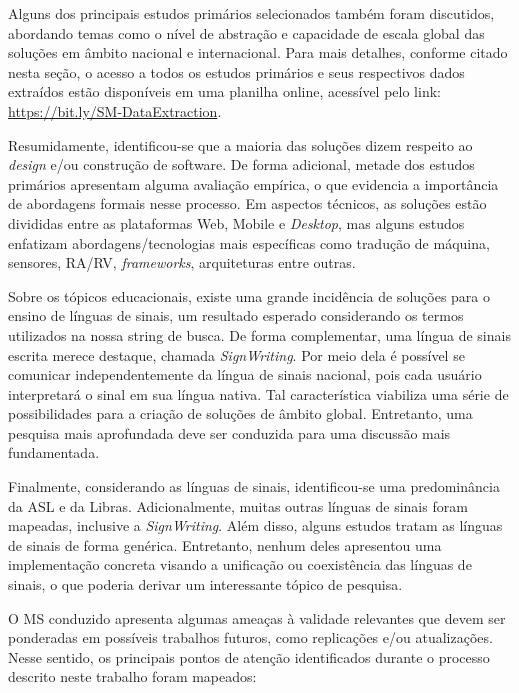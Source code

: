 Alguns dos principais estudos primários selecionados também foram discutidos, abordando temas como o nível de abstração e capacidade de escala global das soluções em âmbito nacional e internacional. Para mais detalhes, conforme citado nesta seção, o acesso a todos os estudos primários e seus respectivos dados extraídos estão disponíveis em uma planilha online, acessível pelo link: \url{https://bit.ly/SM-DataExtraction}.

Resumidamente, identificou-se que a maioria das soluções dizem respeito ao \textit{design} e/ou construção de software. De forma adicional, metade dos estudos primários apresentam alguma avaliação empírica, o que evidencia a importância de abordagens formais nesse processo. Em aspectos técnicos, as soluções estão divididas entre as plataformas Web, Mobile e \textit{Desktop}, mas alguns estudos enfatizam abordagens/tecnologias mais específicas como tradução de máquina, sensores, RA/RV, \textit{frameworks}, arquiteturas entre outras.

Sobre os tópicos educacionais, existe uma grande incidência de soluções para o ensino de línguas de sinais, um resultado esperado considerando os termos utilizados na nossa string de busca. De forma complementar, uma língua de sinais escrita merece destaque, chamada \textit{SignWriting}. Por meio dela é possível se comunicar  independentemente da língua de sinais nacional, pois cada usuário interpretará o sinal em sua língua nativa. Tal característica viabiliza uma série de possibilidades para a criação de soluções de âmbito global. Entretanto, uma pesquisa mais aprofundada deve ser conduzida para uma discussão mais fundamentada.

Finalmente, considerando as línguas de sinais, identificou-se uma predominância da ASL e da Libras. Adicionalmente, muitas outras línguas de sinais foram mapeadas, inclusive a \textit{SignWriting}. Além disso, alguns estudos tratam as línguas de sinais de forma genérica. Entretanto, nenhum deles apresentou uma implementação concreta visando a unificação ou coexistência das línguas de sinais, o que poderia derivar um interessante tópico de pesquisa.

O MS conduzido apresenta algumas ameaças à validade relevantes que devem ser ponderadas em possíveis trabalhos futuros, como replicações e/ou atualizações. Nesse sentido, os principais pontos de atenção identificados durante o processo descrito neste trabalho foram mapeados:

